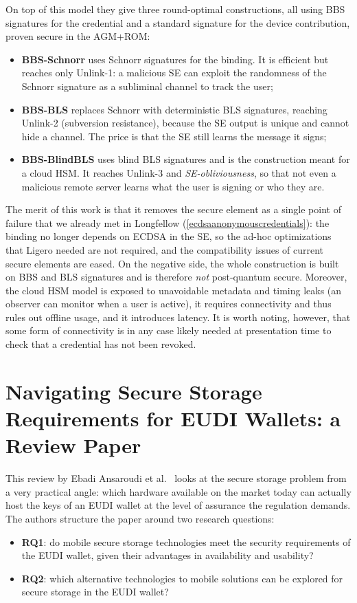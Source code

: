 \documentclass[binding=0.6cm,oneside,noexaminfo]{sapthesis}
\begin{document}
On top of this model they give three round-optimal constructions, all using BBS signatures for the credential and a
standard signature for the device contribution, proven secure in the AGM+ROM:
\begin{itemize}[noitemsep]
  \item \textbf{BBS-Schnorr} uses Schnorr signatures for the binding. It is efficient but reaches only Unlink-1: a
        malicious SE can exploit the randomness of the Schnorr signature as a subliminal channel to track the user;
  \item \textbf{BBS-BLS} replaces Schnorr with deterministic BLS signatures, reaching Unlink-2 (subversion resistance),
        because the SE output is unique and cannot hide a channel. The price is that the SE still learns the message it signs;
  \item \textbf{BBS-BlindBLS} uses blind BLS signatures and is the construction meant for a cloud HSM. It reaches
        Unlink-3 and \emph{SE-obliviousness}, so that not even a malicious remote server learns what the user is signing or who they are.
\end{itemize}

The merit of this work is that it removes the secure element as a single point of failure that we already met in
Longfellow (\cref{ecdsaanonymouscredentials}): the binding no longer depends on ECDSA in the SE, so the ad-hoc
optimizations that Ligero needed are not required, and the compatibility issues of current secure elements are eased.
On the negative side, the whole construction is built on BBS and BLS signatures and is therefore \emph{not}
post-quantum secure. Moreover, the cloud HSM model is exposed to unavoidable metadata and timing leaks (an observer can
monitor when a user is active), it requires connectivity and thus rules out offline usage, and it introduces latency.
It is worth noting, however, that some form of connectivity is in any case likely needed at presentation time to check
that a credential has not been revoked.

\section{Navigating Secure Storage Requirements for EUDI Wallets: a Review Paper}
\label{secstoragereq}
This review by Ebadi Ansaroudi et al.~\cite{Ansaroudi2025Navigating} looks at the secure storage problem from a very
practical angle: which hardware available on the market today can actually host the keys of an EUDI wallet at the level
of assurance the regulation demands. The authors structure the paper around two research questions:
\begin{itemize}[noitemsep]
  \item \textbf{RQ1}: do mobile secure storage technologies meet the security requirements of the EUDI wallet, given their advantages in availability and usability?
  \item \textbf{RQ2}: which alternative technologies to mobile solutions can be explored for secure storage in the EUDI wallet?
\end{itemize}
\end{document}

